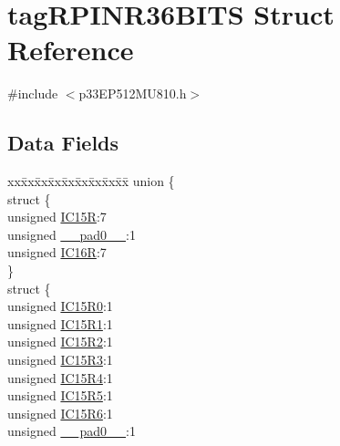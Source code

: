 \hypertarget{structtag_r_p_i_n_r36_b_i_t_s}{}\section{tag\+R\+P\+I\+N\+R36\+B\+I\+TS Struct Reference}
\label{structtag_r_p_i_n_r36_b_i_t_s}


{\ttfamily \#include $<$p33\+E\+P512\+M\+U810.\+h$>$}

\subsection*{Data Fields}
\begin{DoxyCompactItemize}
\item 
\begin{tabbing}
xx\=xx\=xx\=xx\=xx\=xx\=xx\=xx\=xx\=\kill
union \{\\
\>struct \{\\
\>\>unsigned \hyperlink{structtag_r_p_i_n_r36_b_i_t_s_a699ead136d42b5bb27b43a0e09fc45de}{IC15R}:7\\
\>\>unsigned \hyperlink{structtag_r_p_i_n_r36_b_i_t_s_adf71f3d8410c1f1dbbc96680a92c49af}{\_\_pad0\_\_}:1\\
\>\>unsigned \hyperlink{structtag_r_p_i_n_r36_b_i_t_s_a9455c2fc0e626af8f73f8c1af888110f}{IC16R}:7\\
\>\} \\
\>struct \{\\
\>\>unsigned \hyperlink{structtag_r_p_i_n_r36_b_i_t_s_acfa1004d5da88d4dba57a0da78a84ca8}{IC15R0}:1\\
\>\>unsigned \hyperlink{structtag_r_p_i_n_r36_b_i_t_s_afc0dfde3af199fba0cde5fba71c8c773}{IC15R1}:1\\
\>\>unsigned \hyperlink{structtag_r_p_i_n_r36_b_i_t_s_a727968f0c59723118916f2b09d6a55c2}{IC15R2}:1\\
\>\>unsigned \hyperlink{structtag_r_p_i_n_r36_b_i_t_s_a495a6cb405d8de23d8420f590a81d3bd}{IC15R3}:1\\
\>\>unsigned \hyperlink{structtag_r_p_i_n_r36_b_i_t_s_aae9984c5f178aad55e863bb98354c350}{IC15R4}:1\\
\>\>unsigned \hyperlink{structtag_r_p_i_n_r36_b_i_t_s_a1d691972f09d0ab2a7a3f002cb20b7eb}{IC15R5}:1\\
\>\>unsigned \hyperlink{structtag_r_p_i_n_r36_b_i_t_s_a8ad04c9a3a497a57c96a9396285915b8}{IC15R6}:1\\
\>\>unsigned \hyperlink{structtag_r_p_i_n_r36_b_i_t_s_adf71f3d8410c1f1dbbc96680a92c49af}{\_\_pad0\_\_}:1\\

\end{tabbing}
\end{DoxyCompactItemize}
